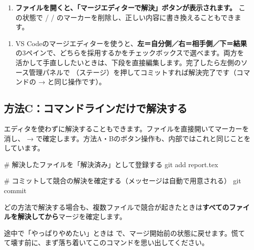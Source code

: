 \begin{enumerate}[leftmargin=1.6em, start=2]
  \item \textbf{ファイルを開くと、「マージエディターで解決」ボタンが表示されます。} この状態で \cmd{<<<<<<<} / \cmd{=======} / \cmd{>>>>>>>} のマーカーを削除し、正しい内容に書き換えることもできます。
\end{enumerate}

\begin{enumerate}[leftmargin=1.6em, start=3]
  \item VS Codeのマージエディターを使うと、\textbf{左＝自分側／右＝相手側／下＝結果}の3ペインで、どちらを採用するかをチェックボックスで選べます。両方を活かして手直ししたいときは、下段を直接編集します。完了したら左側のソース管理パネルで \cmd{+}（ステージ）を押してコミットすれば解決完了です（コマンドの  →  と同じ操作です）。
\end{enumerate}

\subsection{方法C：コマンドラインだけで解決する}

エディタを使わずに解決することもできます。ファイルを直接開いてマーカーを消し、 →  で確定します。方法A・Bのボタン操作も、内部ではこれと同じことをしています。

\begin{codebox}[bash]
\begin{code}
# 解決したファイルを「解決済み」として登録する
git add report.tex

# コミットして競合の解決を確定する（メッセージは自動で用意される）
git commit
\end{code}
\end{codebox}

どの方法で解決する場合も、複数ファイルで競合が起きたときは\textbf{すべてのファイルを解決してから}マージを確定します。

\begin{warnbox}
途中で「やっぱりやめたい」ときは  で、マージ開始前の状態に戻せます。慌てて壊す前に、まず落ち着いてこのコマンドを思い出してください。
\end{warnbox}

